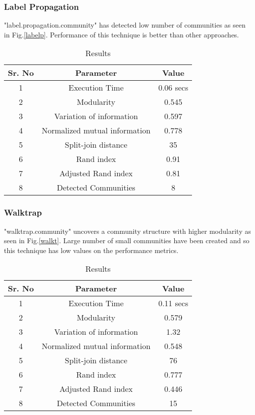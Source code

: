 \subsubsection{Label Propagation}
"label.propagation.community" has detected low number of communities as seen in Fig.\ref{labelp}. Performance of this technique is better than other approaches. 

\begin{table}[H]
\renewcommand{\arraystretch}{1.3}
\caption{Results}
\label{table}
\centering
\begin{tabular}{|c|c|c|}
  \hline
\multicolumn{1}{|c|}{\textbf{Sr. No}} & \multicolumn{1}{c|}{\textbf{Parameter}} & \multicolumn{1}{c|}{\textbf{Value}} \\
  \hline
  1 & Execution Time &  0.06 secs \\
   \hline
  2 & Modularity &  0.545 \\
   \hline
  3 & Variation of information &  0.597 \\
   \hline
  4 & Normalized mutual information &  0.778 \\
   \hline
  5 & Split-join distance &  35 \\
   \hline
  6 & Rand index &  0.91 \\
   \hline
  7 & Adjusted Rand index &  0.81 \\
  \hline
   8 & Detected Communities &  8 \\
  \hline
\end{tabular}
\end{table}

\subsubsection{Walktrap}
"walktrap.community" uncovers a community structure with higher modularity as seen in Fig.\ref{walkt}. Large number of small communities have been created and so this technique has low values on the performance metrics. 

\begin{table}[H]
\renewcommand{\arraystretch}{1.3}
\caption{Results}
\label{table}
\centering
\begin{tabular}{|c|c|c|}
  \hline
\multicolumn{1}{|c|}{\textbf{Sr. No}} & \multicolumn{1}{c|}{\textbf{Parameter}} & \multicolumn{1}{c|}{\textbf{Value}} \\
  \hline
  1 & Execution Time &  0.11 secs \\
   \hline
  2 & Modularity &  0.579 \\
   \hline
  3 & Variation of information &  1.32 \\
   \hline
  4 & Normalized mutual information &  0.548 \\
   \hline
  5 & Split-join distance &  76 \\
   \hline
  6 & Rand index &  0.777 \\
   \hline
  7 & Adjusted Rand index &  0.446 \\
  \hline
   8 & Detected Communities &  15 \\
  \hline
\end{tabular}
\end{table}

